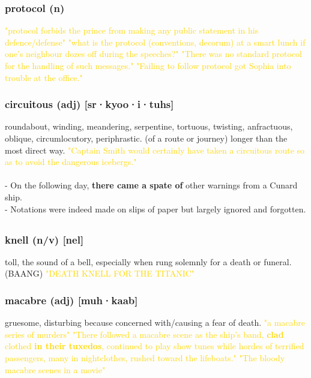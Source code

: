 \documentclass{proc}
\begin{document}
	\subsubsection{\textcolor{brickred}{protocol} (n)}
	\textcolor{gold}{"protocol forbids the prince from making any public statement in his defence/defense" "what is the protocol (conventions, decorum) at a smart lunch if one's neighbour dozes off during the speeches?" "There was no standard protocol for the handling of such messages." "Failing to follow protocol got Sophia into trouble at the office."}
	
	\subsubsection{\textcolor{brickred}{circuitous} (adj) [sr·kyoo·i·tuhs]}
	roundabout, winding, meandering, serpentine, tortuous, twisting, anfractuous, oblique, circumlocutory, periphrastic. (of a route or journey) longer than the most direct way.
	\textcolor{gold}{"Captain Smith would certainly have taken a circuitous route so as to avoid the dangerous icebergs."}\\\\
	- On the following day, \textbf{there came a spate of} other warnings from a Cunard ship.\\
	- Notations were indeed made on slips of paper but largely ignored and forgotten.
	
	\newpage
	\subsection{}
	\subsubsection{\textcolor{brickred}{knell} (n/v) [nel]}
	toll, the sound of a bell, especially when rung solemnly for a death or funeral. (BAANG)
	\textcolor{gold}{ "DEATH KNELL FOR THE TITANIC"}
	
	\subsubsection{\textcolor{brickred}{macabre} (adj) [muh·kaab]}
	gruesome, disturbing because concerned with/causing a fear of death.
	\textcolor{gold}{"a macabre series of murders" "There followed a macabre scene as the ship's band, \textbf{clad} {clothed} \textbf{in their tuxedos}, continued to play show tunes while hordes of terrified passengers, many in nightclothes, rushed toward the lifeboats." "The bloody macabre scenes in a movie"}
	
\end{document}
